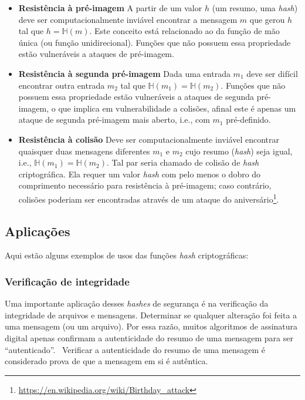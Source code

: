 \begin{itemize}
    \item \textbf{Resistência à pré-imagem}
          \subitem A partir de um valor $h$ (um resumo, uma \textit{hash}) deve ser computacionalmente inviável encontrar a mensagem $m$ que gerou $h$ tal que $h = \mathbb{H}(m)$.
          Este conceito está relacionado ao da função de mão única (ou função unidirecional).
          Funções que não possuem essa propriedade estão vulneráveis a ataques de pré-imagem.
    \item \textbf{Resistência à segunda pré-imagem}
          \subitem Dada uma entrada $m_1$ deve ser difícil encontrar outra entrada $m_2$ tal que $\mathbb{H}(m_1) = \mathbb{H}(m_2)$.
          Funções que não possuem essa propriedade estão vulneráveis a ataques de segunda pré-imagem, o que implica em vulnerabilidade a colisões, afinal este é apenas um ataque de segunda pré-imagem mais aberto, i.e., com $m_1$ pré-definido.
    \item \textbf{Resistência à colisão}
          \subitem Deve ser computacionalmente inviável encontrar quaisquer duas mensagens diferentes $m_1$ e $m_2$ cujo resumo (\textit{hash}) seja igual, i.e., $\mathbb{H}(m_1) = \mathbb{H}(m_2)$.
          \subitem Tal par seria chamado de colisão de \textit{hash} criptográfica.
          Ela requer um valor \textit{hash} com pelo menos o dobro do comprimento necessário para resistência à pré-imagem; caso contrário, colisões poderiam ser encontradas através de um ataque do aniversário\footnote{\url{https://en.wikipedia.org/wiki/Birthday_attack}}.
\end{itemize}

\subsection{Aplicações}

Aqui estão alguns exemplos de usos das funções \textit{hash} criptográficas:

\subsubsection{Verificação de integridade}

Uma importante aplicação desses \textit{hashes} de segurança é na verificação da integridade de arquivos e mensagens.
Determinar se qualquer alteração foi feita a uma mensagem (ou um arquivo).
Por essa razão, muitos algoritmos de assinatura digital apenas confirmam a autenticidade do resumo de uma mensagem para ser ``autenticado''.~\cite{wiki:hashapp1}
Verificar a autenticidade do resumo de uma mensagem é considerado prova de que a mensagem em si é autêntica.

